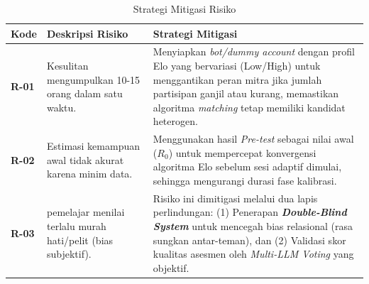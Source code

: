\begin{table}[H]
    \centering
    \caption{Strategi Mitigasi Risiko}
    \label{tbl:strategi_mitigasi}
    \begin{tabular}{|p{}|p{}|p{}|}
        \hline
        \textbf{Kode} & \textbf{Deskripsi Risiko} & \textbf{Strategi Mitigasi} \\
        \hline
        \textbf{R-01} & Kesulitan mengumpulkan 10-15 orang dalam satu waktu. & Menyiapkan \textit{bot/dummy account} dengan profil Elo yang bervariasi (Low/High) untuk menggantikan peran mitra jika jumlah partisipan ganjil atau kurang, memastikan algoritma \textit{matching} tetap memiliki kandidat heterogen. \\
        \hline
        \textbf{R-02} & Estimasi kemampuan awal tidak akurat karena minim data. & Menggunakan hasil \textit{Pre-test} sebagai nilai awal ($R_0$) untuk mempercepat konvergensi algoritma Elo sebelum sesi adaptif dimulai, sehingga mengurangi durasi fase kalibrasi. \\
        \hline
        \textbf{R-03} & pemelajar menilai terlalu murah hati/pelit (bias subjektif). & Risiko ini dimitigasi melalui dua lapis perlindungan: (1) Penerapan \textbf{\textit{Double-Blind System}} untuk mencegah bias relasional (rasa sungkan antar-teman), dan (2) Validasi skor kualitas asesmen oleh \textit{Multi-LLM Voting} yang objektif. \\
        \hline
    \end{tabular}
\end{table}
